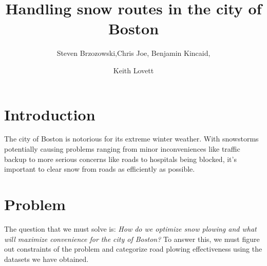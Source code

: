 \documentclass[15pt]{report}
\begin{document}
	
\title{Handling snow routes in the city of Boston} 

\author{Steven Brzozowski,Chris Joe, Benjamin Kincaid, \and Keith Lovett}
\maketitle

\section*{Introduction}
The city of Boston is notorious for its extreme winter weather. With snowstorms potentially causing problems ranging from minor inconveniences like traffic backup to more serious concerns like roads to hospitals being blocked, it's important to clear snow from roads as efficiently as possible. 

\section*{Problem}
The question that we must solve is: \textit{How do we optimize snow plowing and what will maximize convenience for the city of Boston?} To answer this, we must figure out constraints of the problem and categorize road plowing effectiveness using the datasets we have obtained.
\end{document}
